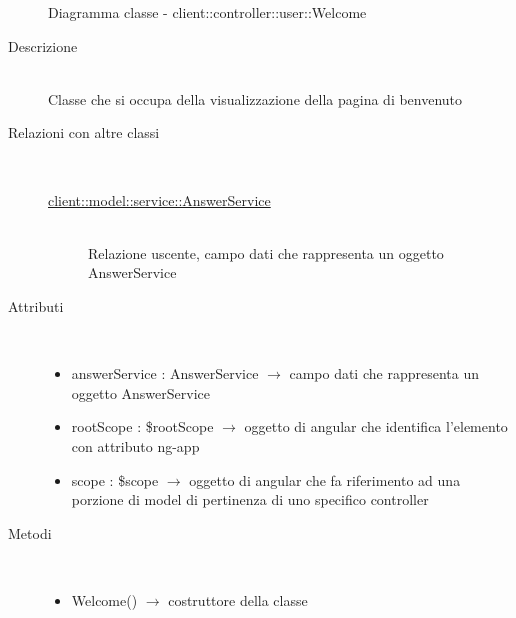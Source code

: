 \begin{figure}[H]
	\centering
	\caption{Diagramma classe - client::controller::user::Welcome}
\end{figure}\begin{description}
\item[Descrizione] \hfill \\
Classe che si occupa della visualizzazione della pagina di benvenuto
\item[Relazioni con altre classi] \hfill \\
\vspace{-7mm}
\begin{description}
	\item[\hyperlink{client::model::service::AnswerService}{client::model::service::AnswerService}] \hfill \\
	Relazione uscente, campo dati che rappresenta un oggetto AnswerService
\end{description}

\item[Attributi] \hfill \\
\vspace{-7mm}
\begin{itemize}
	\item answerService : AnswerService $\rightarrow$ campo dati che rappresenta un oggetto AnswerService
	\item rootScope : \$rootScope $\rightarrow$ oggetto di angular che identifica l’elemento con attributo ng-app	
	\item scope : \$scope $\rightarrow$ oggetto di angular che fa riferimento ad una porzione di model di pertinenza di uno specifico controller
\end{itemize}

\item[Metodi] \hfill \\
\vspace{-7mm}
\begin{itemize}
	\item Welcome() $\rightarrow$ costruttore della classe
\end{itemize}

\end{description}

